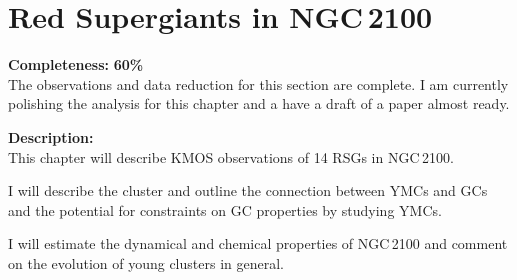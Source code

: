 \chapter{Red Supergiants in NGC\,2100}

\textbf{Completeness:} \textbf{60\%} \\
The observations and data reduction for this section are complete.
I am currently polishing the analysis for this chapter and a have a draft of a paper almost ready.

\textbf{Description:} \\
This chapter will describe KMOS observations of 14 RSGs in NGC\,2100.

I will describe the cluster and outline the connection between YMCs and GCs and the potential
for constraints on GC properties by studying YMCs.

I will estimate the dynamical and chemical properties of NGC\,2100 and comment on the
evolution of young clusters in general.

